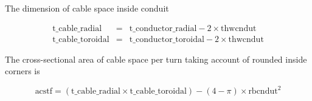 \documentclass[hidelinks]{article}
\numberwithin{equation}{section}
\begin{document}
    \noi The dimension of cable space inside conduit

    \begin{eqnarray}
        \text{t\_cable\_radial} &=& \text{t\_conductor\_radial} - 2 \times \text{thwcndut}\\
        \text{t\_cable\_toroidal} &=& \text{t\_conductor\_toroidal} - 2 \times \text{thwcndut}
    \end{eqnarray}

    \noi The cross-sectional area of cable space per turn taking account of rounded 
    inside corners is 

    \begin{equation}
        \text{acstf} = (\text{t\_cable\_radial}\times \text{t\_cable\_toroidal}) - 
        (4-\pi) \times \text{rbcndut}^2
    \end{equation}
\end{document}
